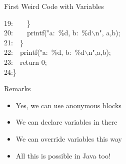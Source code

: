 \begin{Coupe}
\begin{frame}{First Weird Code with Variables}
{{\begin{minipage}{.3\linewidth}
\begin{tabbing}
19:~~~~\}\\
\alert<16| handout:0>{20:~~~~printf("a:~\%d, b:~\%d$\backslash$n", a,b);}\\
21:~~\}\\
\alert<17| handout:0>{22:~~printf("a:~\%d, b:~\%d$\backslash$n",a,b);}\\
23:~~return 0;\\
24:\}  
  \end{tabbing}          
  \end{minipage}}}\hfill%
  \begin{minipage}{.5\linewidth}
    \begin{block}{Remarks}
      \begin{itemize}
      \item Yes, we can use anonymous blocks
      \item We can declare variables in there
      \item We can override variables this way
      \item All this is possible in Java too!
      \end{itemize}
    \end{block}\vspace{-\baselineskip}


\end{minipage}
\end{frame}
\end{Coupe}
